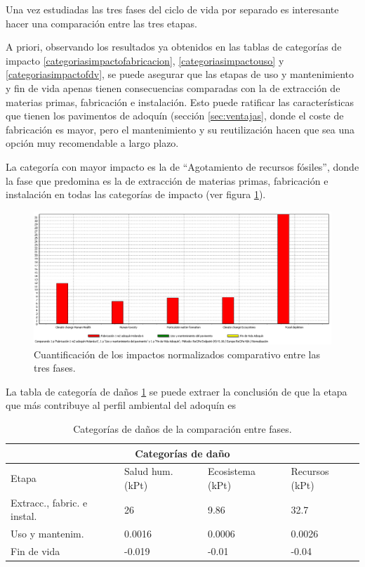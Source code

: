 Una vez estudiadas las tres fases del ciclo de vida por separado es interesante hacer una comparación entre las tres etapas.

A priori, observando los resultados ya obtenidos en las tablas de categorías de impacto \ref{categoriasimpactofabricacion}, \ref{categoriasimpactouso} y \ref{categoriasimpactofdv}, se puede asegurar que las etapas de uso y mantenimiento y fin de vida apenas tienen consecuencias comparadas con la de extracción de materias primas, fabricación e instalación. Esto puede ratificar las características que tienen los pavimentos de adoquín (sección \ref{sec:ventajas}, donde el coste de fabricación es mayor, pero el mantenimiento y su reutilización hacen que sea una opción muy recomendable a largo plazo.

La categoría con mayor impacto es la de ``Agotamiento de recursos fósiles'', donde la fase que predomina es la de extracción de materias primas, fabricación e instalación en todas las categorías de impacto (ver figura \ref{fig:compar_normalizacion}).

\begin{figure}[!htb]
\centering
\includegraphics[width=15cm]{img/compar_normalizacion.png}
\caption{Cuantificación de los impactos normalizados comparativo entre las tres fases.}
\label{fig:compar_normalizacion}
\end{figure}

La tabla de categoría de daños \ref{categoriasdanoscompar} se puede extraer la conclusión de que la etapa que más contribuye al perfil ambiental del adoquín es

\begin{table}[!htb]
\centering
\begin{tabular}{p{6cm}p{2cm}p{2cm}p{2cm}}
\toprule
\multicolumn{4}{c}{Categorías de daño}\\
\midrule
Etapa & Salud hum. (kPt) & Ecosistema (kPt) & Recursos (kPt)\\
\midrule
Extracc., fabric. e instal. & 26 & 9.86 & 32.7\\
Uso y mantenim. & 0.0016 & 0.0006 & 0.0026 \\
Fin de vida & -0.019 & -0.01 & -0.04 \\
\bottomrule
\end{tabular}
\caption{Categorías de daños de la comparación entre fases.}
\label{categoriasdanoscompar}
\end{table}

